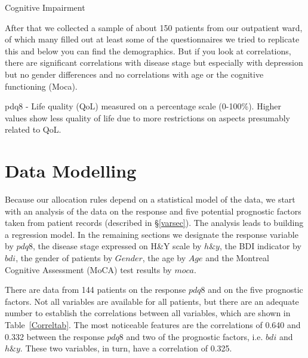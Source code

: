 \documentclass[number,12pt,review]{elsarticle}
\begin{document}
Cognitive Impairment

After that we collected a sample of about 150 patients from our outpatient ward, of which many filled out at least some of the
questionnaires we tried to replicate this and below you can find the demographics. But if you look at correlations, there are
significant correlations with disease stage but especially with depression but no gender differences and no correlations with age
or the cognitive functioning (Moca).

pdq8 - Life quality (QoL) measured on a percentage scale (0-100\%). Higher values show less quality of life due to more restrictions on aspects presumably related to QoL.

\section{Data Modelling}

\label{datmodsec}

Because our allocation rules depend on a statistical model of the data, we start with an analysis of the data on the response and five potential prognostic factors taken from patient records (described in \S\ref{varsec}). The analysis leads to building a regression model. In the remaining sections we designate
the response variable by $pdq8$, the disease stage expressed on H\&Y scale by $h\&y$, the BDI indicator by $bdi$,
the gender of patients by $Gender$, the age by $Age$ and the Montreal Cognitive Assessment (MoCA) test \citep{nasreddine2005montreal} results by $moca$.

There are data from 144 patients on the response $pdq8$ and on the five prognostic factors. Not all variables are available for all patients, but there are an adequate number to establish the correlations between all variables, which are shown in Table~\ref{Correltab}. The most noticeable features are the correlations of 0.640 and 0.332 between the response $pdq8$ and two of the prognostic factors, i.e. $bdi$ and $h\&y$. These two variables, in turn, have a correlation of 0.325.

\begin{table}[ht]
\end{table}
\end{document}
